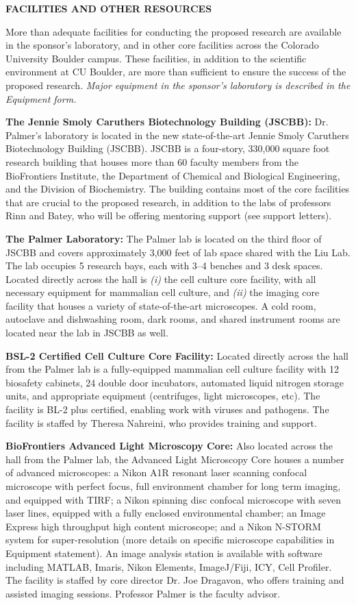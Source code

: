 \documentclass{F32}
\begin{document}
\begin{center}
\bf FACILITIES AND OTHER RESOURCES
\end{center}
More than adequate facilities for conducting the proposed research are available in the sponsor's laboratory, and in other core facilities across the Colorado University Boulder campus. These facilities, in addition to the scientific environment at CU Boulder, are more than sufficient to ensure the success of the proposed research. \textit{Major equipment in the sponsor's laboratory is described in the Equipment form.}

  {\bf The Jennie Smoly Caruthers Biotechnology Building (JSCBB):} Dr. Palmer’s laboratory is located in the new state-of-the-art Jennie Smoly Caruthers Biotechnology Building (JSCBB). JSCBB is a four-story, 330,000 square foot research building that houses more than 60 faculty members from the BioFrontiers Institute, the Department of Chemical and Biological Engineering, and the Division of Biochemistry. The building contains most of the core facilities that are crucial to the proposed research, in addition to the labs of professors Rinn and Batey, who will be offering mentoring support (see support letters).

  {\bf The Palmer Laboratory:} The Palmer lab is located on the third floor of JSCBB and covers approximately 3,000 feet of lab space shared with the Liu Lab. The lab occupies 5 research bays, each with 3--4 benches and 3 desk spaces. Located directly across the hall is \textit{(i)} the cell culture core facility, with all necessary equipment for mammalian cell culture, and \textit{(ii)} the imaging core facility that houses a variety of state-of-the-art microscopes. A cold room, autoclave and dishwashing room, dark rooms, and shared instrument rooms are located near the lab in JSCBB as well.

  {\bf BSL-2 Certified Cell Culture Core Facility:} Located directly across the hall from the Palmer lab is a fully-equipped mammalian cell culture facility with 12 biosafety cabinets, 24 double door incubators, automated liquid nitrogen storage units, and appropriate equipment (centrifuges, light microscopes, etc). The facility is BL-2 plus certified, enabling work with viruses and pathogens. The facility is staffed by Theresa Nahreini, who provides training and support.

  {\bf BioFrontiers Advanced Light Microscopy Core:} Also located across the hall from the Palmer lab, the Advanced Light Microscopy Core houses a number of advanced microscopes: a Nikon A1R resonant laser scanning confocal microscope with perfect focus, full environment chamber for long term imaging, and equipped with TIRF; a Nikon spinning disc confocal microscope with seven laser lines, equipped with a fully enclosed environmental chamber; an Image Express high throughput high content microscope; and a Nikon N-STORM system for super-resolution (more details on specific microscope capabilities in Equipment statement). An image analysis station is available with software including MATLAB, Imaris, Nikon Elements, ImageJ/Fiji, ICY, Cell Profiler. The facility is staffed by core director Dr. Joe Dragavon, who offers  training and assisted imaging sessions. Professor Palmer is the faculty advisor.
\end{document}
